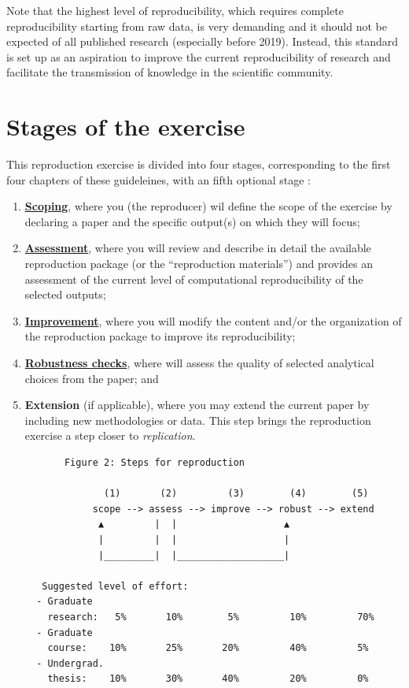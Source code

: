 \documentclass[]{book}
\begin{document}
Note that the highest level of reproducibility, which requires complete reproducibility starting from raw data, is very demanding and it should not be expected of all published research (especially before 2019). Instead, this standard is set up as an aspiration to improve the current reproducibility of research and facilitate the transmission of knowledge in the scientific community.

\hypertarget{stages-of-the-exercise}{%
\section*{Stages of the exercise}\label{stages-of-the-exercise}}

This reproduction exercise is divided into four stages, corresponding to the first four chapters of these guideleines, with an fifth optional stage :

\begin{enumerate}
\def\labelenumi{\arabic{enumi}.}
\item
  \protect\hyperlink{scoping}{\textbf{Scoping}}, where you (the reproducer) wil define the scope of the exercise by declaring a paper and the specific output(s) on which they will focus;\\
\item
  \protect\hyperlink{assessment}{\textbf{Assessment}}, where you will review and describe in detail the available reproduction package (or the ``reproduction materials'') and provides an assessment of the current level of computational reproducibility of the selected outputs;
\item
  \protect\hyperlink{improvements}{\textbf{Improvement}}, where you will modify the content and/or the organization of the reproduction package to improve its reproducibility;\\
\item
  \protect\hyperlink{robust}{\textbf{Robustness checks}}, where will assess the quality of selected analytical choices from the paper; and\\
\item
  \textbf{Extension} (if applicable), where you may extend the current paper by including new methodologies or data. This step brings the reproduction exercise a step closer to \emph{replication}.

\begin{verbatim}
       Figure 2: Steps for reproduction

              (1)       (2)         (3)        (4)        (5)
            scope --> assess --> improve --> robust --> extend
             ▲         |  |                   ▲
             |         |  |                   |
             |_________|  |___________________|

   Suggested level of effort:
  - Graduate
    research:   5%       10%        5%         10%         70%
  - Graduate
    course:    10%       25%       20%         40%         5%
  - Undergrad.
    thesis:    10%       30%       40%         20%         0%
\end{verbatim}
\end{enumerate}
\end{document}
